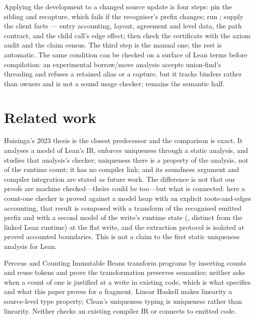 \documentclass[a4paper,UKenglish,cleveref]{lipics-v2021}
\begin{document}
Applying the development to a changed source update is four steps: pin the sibling
and recapture, which fails if the recogniser's prefix changes; run
; supply the client facts — entry accounting, layout, agreement
and level data, the path contract, and the child call's edge effect; then check the
certificate with the axiom audit and the claim census. The third step is the manual
one; the rest is automatic. The same condition can be checked on a surface of Lean terms
before compilation: an experimental borrow/move analysis accepts union-find's
threading and refuses a retained alias or a capture, but it tracks binders rather
than owners and is not a sound usage checker;  remains the
semantic half.

\section{Related work}\label{sec:related}

Huisinga's 2023 thesis \cite{huisinga} is the closest predecessor and the
comparison is exact. It analyses a model of Lean's IR, enforces uniqueness through
a static analysis, and studies that analysis's checker; uniqueness there is a
property of the analysis, not of the runtime count; it has no compiler link; and
its soundness argument and compiler integration are stated as future work. The
difference is not that our proofs are machine checked---theirs could be
too---but what is connected: here a count-one checker is proved against a model
heap with an explicit roots-and-edges accounting, that result is composed with a
transform of the recognised emitted prefix and with a second model of the write's
runtime state (, distinct from the linked Lean runtime) at the
flat write, and the extraction protocol is isolated at proved accounted
boundaries. This is not a claim to the first static uniqueness analysis for Lean.

Perceus \cite{perceus} and Counting Immutable Beans \cite{countingbeans} transform
programs by inserting counts and reuse tokens and prove the transformation
preserves semantics; neither asks when a count of one is justified at a write in
existing code, which is what  specifies and what this paper proves
for a fragment. Linear Haskell \cite{linearhaskell} makes linearity a source-level
type property; Clean's uniqueness typing \cite{uniqueness} is uniqueness rather
than linearity. Neither checks an existing compiler IR or connects to emitted
code.
\end{document}
